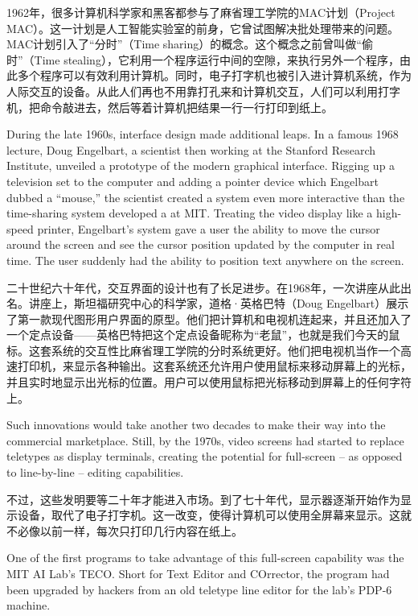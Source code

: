 \ifdefined\chs
1962年，很多计算机科学家和黑客都参与了麻省理工学院的MAC计划（Project MAC）。这一计划是人工智能实验室的前身，它曾试图解决批处理带来的问题。MAC计划引入了``分时''（Time sharing）的概念。这个概念之前曾叫做``偷时''（Time stealing），它利用一个程序运行中间的空隙，来执行另外一个程序，由此多个程序可以有效利用计算机。同时，电子打字机也被引入进计算机系统，作为人际交互的设备。从此人们再也不用靠打孔来和计算机交互，人们可以利用打字机，把命令敲进去，然后等着计算机把结果一行一行打印到纸上。
\fi

\ifdefined\eng
During the late 1960s, interface design made additional leaps. In a famous 1968 lecture, Doug Engelbart, a scientist then working at the Stanford Research Institute, unveiled a prototype of the modern graphical interface. Rigging up a television set to the computer and adding a pointer device which Engelbart dubbed a ``mouse,'' the scientist created a system even more interactive than the time-sharing system developed \ifdefined\vone a \fi\ifdefined\vtwo at \fi MIT. Treating the video display like a high-speed printer, Engelbart's system gave a user the ability to move the cursor around the screen and see the cursor position updated by the computer in real time. The user suddenly had the ability to position text anywhere on the screen.
\fi

\ifdefined\chs
二十世纪六十年代，交互界面的设计也有了长足进步。在1968年，一次讲座从此出名。讲座上，斯坦福研究中心的科学家，道格·英格巴特（Doug Engelbart）展示了第一款现代图形用户界面的原型。他们把计算机和电视机连起来，并且还加入了一个定点设备——英格巴特把这个定点设备昵称为``老鼠''，也就是我们今天的鼠标。这套系统的交互性比麻省理工学院的分时系统更好。他们把电视机当作一个高速打印机，来显示各种输出。这套系统还允许用户使用鼠标来移动屏幕上的光标，并且实时地显示出光标的位置。用户可以使用鼠标把光标移动到屏幕上的任何字符上。
\fi

\ifdefined\eng
Such innovations would take another two decades to make their way into the commercial marketplace. Still, by the 1970s, video screens had started to replace teletypes as display terminals, creating the potential for full-screen -- as opposed to line-by-line -- editing capabilities.
\fi

\ifdefined\chs
不过，这些发明要等二十年才能进入市场。到了七十年代，显示器逐渐开始作为显示设备，取代了电子打字机。这一改变，使得计算机可以使用全屏幕来显示。这就不必像以前一样，每次只打印几行内容在纸上。
\fi

\ifdefined\eng
One of the first programs to take advantage of this full-screen capability was the MIT AI Lab's TECO. Short for Text Editor and COrrector, the program had been upgraded by hackers from an old teletype line editor for the lab's PDP-6 machine.
\fi

